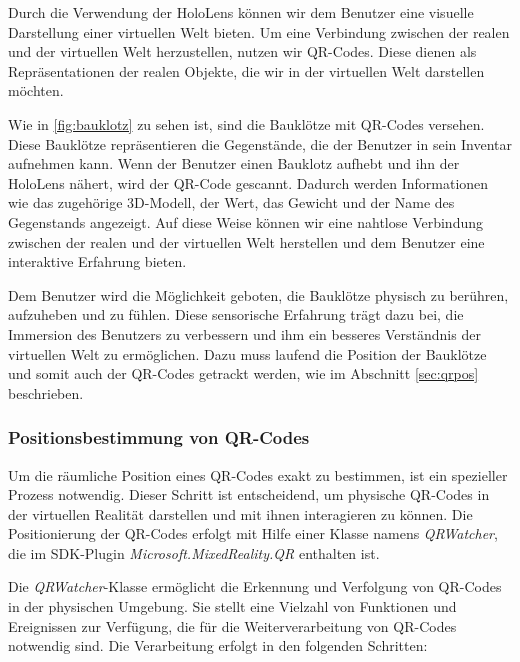 Durch die Verwendung der HoloLens können wir dem Benutzer eine visuelle Darstellung einer virtuellen Welt bieten. Um eine
Verbindung zwischen der realen und der virtuellen Welt herzustellen, nutzen wir QR-Codes.  Diese dienen als Repräsentationen
der realen Objekte, die wir in der virtuellen Welt darstellen möchten.

Wie in \ref{fig:bauklotz} zu sehen ist, sind die Bauklötze mit QR-Codes versehen. Diese Bauklötze repräsentieren die Gegenstände,
die der Benutzer in sein Inventar aufnehmen kann. Wenn der Benutzer einen Bauklotz aufhebt und ihn der HoloLens nähert, wird
der QR-Code gescannt. Dadurch werden Informationen wie das zugehörige 3D-Modell, der Wert, das Gewicht und der Name des
Gegenstands angezeigt. Auf diese Weise können wir eine nahtlose Verbindung zwischen der realen und der virtuellen Welt
herstellen und dem Benutzer eine interaktive Erfahrung bieten.

Dem Benutzer wird die Möglichkeit geboten, die Bauklötze physisch zu berühren, aufzuheben und zu fühlen. Diese sensorische
Erfahrung trägt dazu bei, die Immersion des Benutzers zu verbessern und ihm ein besseres Verständnis der virtuellen Welt
zu ermöglichen. Dazu muss laufend die Position der Bauklötze und somit auch der QR-Codes getrackt werden, wie im Abschnitt
\ref{sec:qrpos} beschrieben.


\subsubsection{\label{sec:qrpos}Positionsbestimmung von QR-Codes}
Um die räumliche Position eines QR-Codes exakt zu bestimmen, ist ein spezieller Prozess notwendig. Dieser Schritt ist entscheidend, um physische QR-Codes in der virtuellen Realität darstellen und mit ihnen interagieren zu können. Die Positionierung der QR-Codes erfolgt mit Hilfe einer Klasse namens \textit{QRWatcher}, die im SDK-Plugin \textit{Microsoft.MixedReality.QR} enthalten ist.

Die \textit{QRWatcher}-Klasse ermöglicht die Erkennung und Verfolgung von QR-Codes in der physischen Umgebung. Sie stellt eine Vielzahl von Funktionen und Ereignissen zur Verfügung, die für die Weiterverarbeitung von QR-Codes notwendig sind. Die Verarbeitung erfolgt in den folgenden Schritten:

